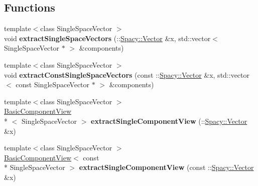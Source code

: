 \subsection*{Functions}
\begin{DoxyCompactItemize}
\item 
\hypertarget{namespaceSpacy_1_1ProductSpace_acbae440a7b0142c22b3abb4fceec6a3d}{{\footnotesize template$<$class Single\-Space\-Vector $>$ }\\void {\bfseries extract\-Single\-Space\-Vectors} (\-::\hyperlink{classSpacy_1_1Vector}{Spacy\-::\-Vector} \&x, std\-::vector$<$ Single\-Space\-Vector $\ast$ $>$ \&components)}\label{namespaceSpacy_1_1ProductSpace_acbae440a7b0142c22b3abb4fceec6a3d}

\item 
\hypertarget{namespaceSpacy_1_1ProductSpace_a21a0ee5576b97303796ff46d59b2e138}{{\footnotesize template$<$class Single\-Space\-Vector $>$ }\\void {\bfseries extract\-Const\-Single\-Space\-Vectors} (const \-::\hyperlink{classSpacy_1_1Vector}{Spacy\-::\-Vector} \&x, std\-::vector$<$ const Single\-Space\-Vector $\ast$ $>$ \&components)}\label{namespaceSpacy_1_1ProductSpace_a21a0ee5576b97303796ff46d59b2e138}

\item 
\hypertarget{namespaceSpacy_1_1ProductSpace_ad68c9cf83d263605393f28af63801f29}{{\footnotesize template$<$class Single\-Space\-Vector $>$ }\\\hyperlink{structSpacy_1_1ProductSpace_1_1BasicComponentView}{Basic\-Component\-View}\\*
$<$ Single\-Space\-Vector $>$ {\bfseries extract\-Single\-Component\-View} (\-::\hyperlink{classSpacy_1_1Vector}{Spacy\-::\-Vector} \&x)}\label{namespaceSpacy_1_1ProductSpace_ad68c9cf83d263605393f28af63801f29}

\item 
\hypertarget{namespaceSpacy_1_1ProductSpace_af3dc843c29a545e7f7f4e45b5ae5b02b}{{\footnotesize template$<$class Single\-Space\-Vector $>$ }\\\hyperlink{structSpacy_1_1ProductSpace_1_1BasicComponentView}{Basic\-Component\-View}$<$ const \\*
Single\-Space\-Vector $>$ {\bfseries extract\-Single\-Component\-View} (const \-::\hyperlink{classSpacy_1_1Vector}{Spacy\-::\-Vector} \&x)}\label{namespaceSpacy_1_1ProductSpace_af3dc843c29a545e7f7f4e45b5ae5b02b}


\end{DoxyCompactItemize}
